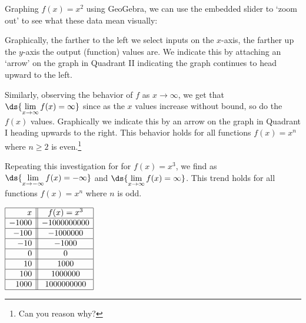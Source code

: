 \documentclass{ximera}
\begin{document}
Graphing $f(x) = x^2$ using GeoGebra, we can use the embedded slider to `zoom out' to see what these data mean visually:

\begin{center}
\end{center}

Graphically, the farther to the left we select inputs on the $x$-axis, the farther up the $y$-axis the output (function) values are.  We indicate this by attaching an  `arrow' on the graph in Quadrant II indicating the graph continues to head upward to the left.  

Similarly, observing the behavior of $f$ as $x \rightarrow \infty$,  we get that   $\ds{ \lim_{x \rightarrow \infty} f(x) = \infty}$ since as the $x$ values increase without bound, so do the $f(x)$ values.  Graphically we indicate this by an arrow on the graph in Quadrant I heading upwards to the right.  This behavior holds for all functions $f(x) = x^n$ where $n \geq 2$ is even.\footnote{Can you reason why?}

Repeating this investigation for  for $f(x) = x^3$,  we find as $\ds{ \lim_{x \rightarrow - \infty} f(x) =  -\infty}$ and $\ds{ \lim_{x \rightarrow \infty} f(x) = \infty}$.  This trend holds for all functions $f(x) = x^n$ where $n$ is odd. 


\begin{center}
$\begin{array}{|r||c|}  \hline

 x &  f(x) = x^3  \\ \hline
 -1000 & -1000000000 \\  \hline
 -100 & -1000000 \\  \hline
 -10 & -1000  \\  \hline
 0 &  0  \\  \hline
 10 & 1000  \\  \hline
 100&  1000000 \\  \hline
 1000 & 1000000000 \\  \hline

\end{array}$
\end{center}

\begin{center}
\end{center}
\end{document}
